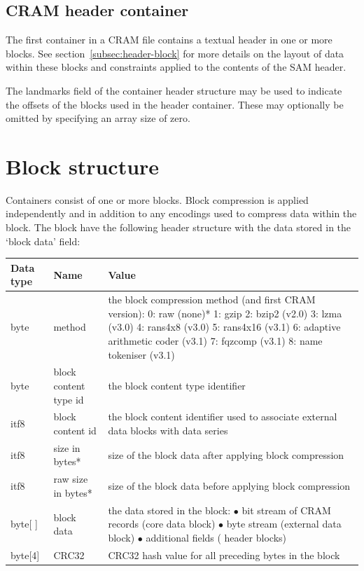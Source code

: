\documentclass[a4paper]{article}
\begin{document}
\subsection{\textbf{CRAM header container}}
\label{subsec:cram-header-container}

The first container in a CRAM file contains a textual header in one or more blocks.  See section~\ref{subsec:header-block} for more details on the layout of data within these blocks and constraints applied to the contents of the SAM header.

The landmarks field of the container header structure may be used to
indicate the offsets of the blocks used in the header container.
These may optionally be omitted by specifying an array size of zero.

\section{\textbf{Block structure}}
\label{sec:block-struct}

Containers consist of one or more blocks. Block compression is applied independently 
and in addition to any encodings used to compress data within the block. The block 
have the following header structure with the data stored in the `block data' field:

\begin{tabular}{|l|>{\raggedright}p{120pt}|>{\raggedright}p{260pt}|}
\hline
\textbf{Data type} & \textbf{Name} & \textbf{Value}
\tabularnewline
\hline
byte & method & the block compression method (and first CRAM version): \linebreak{}
0: raw (none)*\linebreak{}
1: gzip\linebreak{}
2: bzip2 (v2.0)\linebreak{}
3: lzma (v3.0)\linebreak{}
4: rans4x8 (v3.0)\linebreak{}
5: rans4x16 (v3.1)\linebreak{}
6: adaptive arithmetic coder (v3.1)\linebreak{}
7: fqzcomp (v3.1)\linebreak{}
8: name tokeniser (v3.1)
\tabularnewline
\hline
byte & block content type id & the block content type identifier\tabularnewline
\hline
itf8 & block content id & the block content identifier used to associate external 
data blocks with data series\tabularnewline
\hline
itf8 & size in bytes* & size of the block data after applying block compression\tabularnewline
\hline
itf8 & raw size in bytes* & size of the block data before applying block compression\tabularnewline
\hline
byte[ ] & block data & the data stored in the block:\linebreak{}
$\bullet$ bit stream of CRAM records (core data block)\linebreak{}
$\bullet$ byte stream (external data block)\linebreak{}
$\bullet$ additional fields ( header blocks)\tabularnewline
\hline
byte[4] & CRC32 & CRC32 hash value for all preceding bytes in the block\tabularnewline
\hline
\end{tabular}
\end{document}
